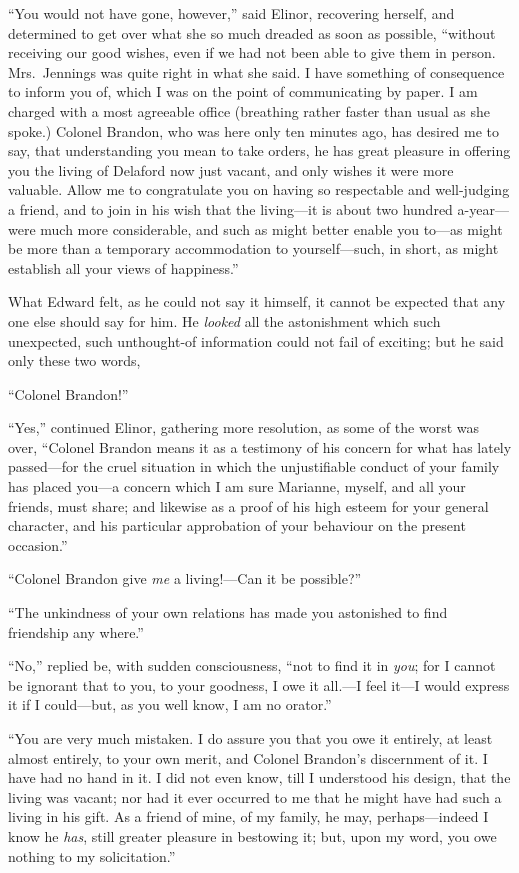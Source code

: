 ``You would not have gone, however,'' said Elinor,
recovering herself, and determined to get over what she
so much dreaded as soon as possible, ``without receiving
our good wishes, even if we had not been able to give them
in person.  Mrs.\ Jennings was quite right in what she said.
I have something of consequence to inform you of,
which I was on the point of communicating by paper.
I am charged with a most agreeable office (breathing
rather faster than usual as she spoke.)  Colonel Brandon,
who was here only ten minutes ago, has desired me to say,
that understanding you mean to take orders, he has
great pleasure in offering you the living of Delaford
now just vacant, and only wishes it were more valuable.
Allow me to congratulate you on having so respectable
and well-judging a friend, and to join in his wish that
the living---it is about two hundred a-year---were much
more considerable, and such as might better enable you
to---as might be more than a temporary accommodation to
yourself---such, in short, as might establish all your views
of happiness.''

What Edward felt, as he could not say it himself,
it cannot be expected that any one else should say for him.
He \emph{looked} all the astonishment which such unexpected,
such unthought-of information could not fail of exciting;
but he said only these two words,

``Colonel Brandon!''

``Yes,'' continued Elinor, gathering more resolution,
as some of the worst was over, ``Colonel Brandon means
it as a testimony of his concern for what has lately
passed---for the cruel situation in which the unjustifiable
conduct of your family has placed you---a concern
which I am sure Marianne, myself, and all your friends,
must share; and likewise as a proof of his high esteem
for your general character, and his particular approbation
of your behaviour on the present occasion.''

``Colonel Brandon give \emph{me} a living!---Can it be possible?''

``The unkindness of your own relations has made you
astonished to find friendship any where.''

``No,'' replied be, with sudden consciousness, ``not to
find it in \emph{you}; for I cannot be ignorant that to you,
to your goodness, I owe it all.---I feel it---I would express
it if I could---but, as you well know, I am no orator.''

``You are very much mistaken.  I do assure you
that you owe it entirely, at least almost entirely,
to your own merit, and Colonel Brandon's discernment
of it.  I have had no hand in it.  I did not even know,
till I understood his design, that the living was vacant;
nor had it ever occurred to me that he might have
had such a living in his gift.  As a friend of mine,
of my family, he may, perhaps---indeed I know he \emph{has},
still greater pleasure in bestowing it; but, upon my word,
you owe nothing to my solicitation.''

